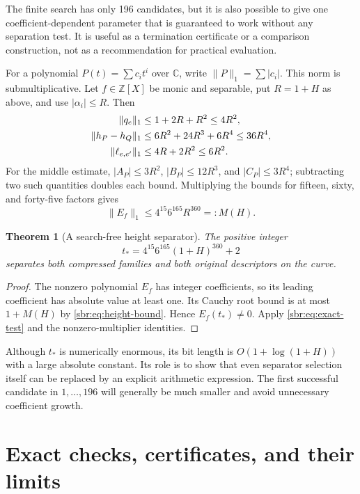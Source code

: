 \documentclass[11pt,letterpaper]{article}
\numberwithin{equation}{section}
\newtheorem{theorem}{Theorem}[section]
\theoremstyle{definition}
\theoremstyle{remark}
\newcommand{\ZZ}{\mathbb Z}
\newcommand{\CC}{\mathbb C}
\begin{document}
The finite search has only 196 candidates, but it is also possible to give
one coefficient-dependent parameter that is guaranteed to work without
any separation test. It is useful as a termination certificate or a
comparison construction, not as a recommendation for practical evaluation.

For a polynomial $P(t)=\sum c_it^i$ over $\CC$, write
$\|P\|_1=\sum|c_i|$. This norm is submultiplicative. Let $f\in\ZZ[X]$ be
monic and separable, put $R=1+H$ as above, and use $|\alpha_i|\le R$.
Then
\begin{align}
 \|q_e\|_1&\le1+2R+R^2\le4R^2,\notag\\
 \|h_P-h_Q\|_1&\le6R^2+24R^3+6R^4\le36R^4,\notag\\
 \|\ell_{e,e'}\|_1&\le4R+2R^2\le6R^2.
 \label{sbr:eq:norms}
\end{align}
For the middle estimate, $|A_P|\le3R^2$, $|B_P|\le12R^3$, and
$|C_P|\le3R^4$; subtracting two such quantities doubles each bound.
Multiplying the bounds for fifteen, sixty, and forty-five factors gives
\begin{equation}
 \|E_f\|_1\le4^{15}6^{165}R^{360}=:M(H).
 \label{sbr:eq:height-bound}
\end{equation}

\begin{theorem}[A search-free height separator]
\label{sbr:thm:height}
The positive integer
\begin{equation}
 t_\ast=4^{15}6^{165}(1+H)^{360}+2
 \label{sbr:eq:height-separator}
\end{equation}
separates both compressed families and both original descriptors on the
curve.
\end{theorem}
\begin{proof}
The nonzero polynomial $E_f$ has integer coefficients, so its leading
coefficient has absolute value at least one. Its Cauchy root bound is at
most $1+M(H)$ by \cref{sbr:eq:height-bound}. Hence $E_f(t_\ast)\ne0$.
Apply \cref{sbr:eq:exact-test} and the nonzero-multiplier identities.
\end{proof}

Although $t_\ast$ is numerically enormous, its bit length is $O(1+\log(1+H))$
with a large absolute constant. Its role is to show that even separator
selection itself can be replaced by an explicit arithmetic expression.
The first successful candidate in $1,\ldots,196$ will generally be much
smaller and avoid unnecessary coefficient growth.

\section{Exact checks, certificates, and their limits}
\label{sbr:sec:checks}
\end{document}
